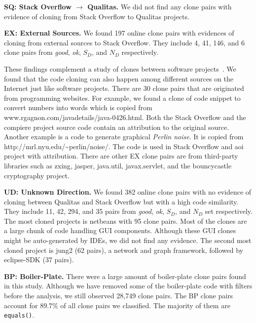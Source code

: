 \documentclass[sigconf,review, anonymous]{acmart}
\begin{document}
\textbf{SQ: Stack Overflow $\rightarrow$ Qualitas.} We did not find any clone pairs with evidence of cloning from Stack Overflow to Qualitas projects.

\textbf{EX: External Sources.} We found 197 online clone pairs with evidences of cloning from external sources to Stack Overflow. They include 4, 41, 146, and 6 clone pairs from \textit{good}, \textit{ok}, $S_D$, and $N_D$ respectively.

These findings complement a study of clones between software projects~\cite{Svajlenko2014}. We found that the code cloning can also happen among different sources on the Internet just like software projects. There are 30 clone pairs that are originated from programming websites. For example, we found a clone of code snippet to convert numbers into words which is copied from www.rgagnon.com/javadetails/java-0426.html. Both the Stack Overflow and the \textsf{compiere} project source code contain an attribution to the original source. Another example is a code to generate graphical \textit{Perlin noise}. It is copied from http://mrl.nyu.edu/\textasciitilde perlin/noise/. The code is used in Stack Overflow and \textsf{aoi} project with attribution. %
There are other EX clone pairs are from third-party libraries such as \textsf{zxing}, \textsf{jasper}, \textsf{java.util}, \textsf{javax.servlet}, and the \textsf{bouncycastle} cryptography project.

\textbf{UD: Unknown Direction.} We found 382 online clone pairs with no evidence of cloning between Qualitas and Stack Overflow but with a high code similarity. They include 11, 42, 294, and 35 pairs from \textit{good}, \textit{ok}, $S_D$, and $N_D$ set respectively. The most cloned projects is \textsf{netbeans} with 95 clone pairs. Most of the clones are a large chunk of code handling GUI components. Although these GUI clones might be auto-generated by IDEs, we did not find any evidence. The second most cloned project is \textsf{jung2} (62 pairs), a network and graph framework, followed by \textsf{eclipse-SDK} (37 pairs). %

\textbf{BP: Boiler-Plate.} There were a large amount of boiler-plate clone pairs found in this study. Although we have removed some of the boiler-plate code with filters before the analysis, we still observed 28,749 clone pairs. The BP clone pairs account for 89.7\% of all clone pairs we classified. The majority of them are {\small{\texttt{equals()}}}.
\end{document}
